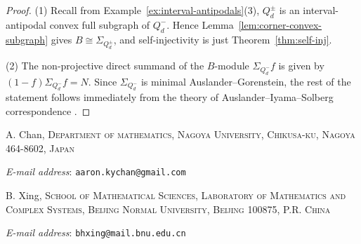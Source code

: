 \documentclass[a4paper,leqno]{amsart}
\makeatletter
\newcommand{\Addresses}{{%
  \bigskip
  \footnotesize

  A. Chan, \textsc{Department of mathematics, Nagoya University, Chikusa-ku, Nagoya 464-8602, Japan}\par\nopagebreak
  \textit{E-mail address}: \texttt{aaron.kychan@gmail.com}

  \medskip

  B. Xing, \textsc{School of Mathematical Sciences, Laboratory of Mathematics and Complex Systems, Beijing Normal University, Beijing 100875, P.R. China}\par\nopagebreak
\textit{E-mail address}: \texttt{bhxing@mail.bnu.edu.cn}
}}
\makeatother
\begin{document}
\begin{proof}
(1) Recall from Example~\ref{ex:interval-antipodals}(3), $Q_d^{\pm}$ is an interval-antipodal convex full subgraph of $Q_d^{-}$. Hence
Lemma~\ref{lem:corner-convex-subgraph} gives
$B\cong\Sigma_{Q_d^{\pm}}$, and self-injectivity is just Theorem~\ref{thm:self-inj}.

(2) The non-projective direct summand of the $B$-module $\Sigma_{Q_d^-}f$ is given by $(1-f)\Sigma_{Q_d^-} f = N$.  
Since $\Sigma_{Q_d^-}$ is minimal Auslander--Gorenstein, the rest of the statement follows immediately from the theory of Auslander--Iyama--Solberg correspondence \cite[Proposition~4.4, Theorem~4.5, Section 6]{IS18}.
\end{proof}






\Addresses
\end{document}
